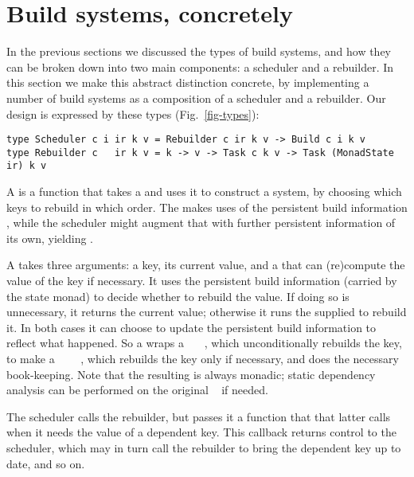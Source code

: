 \section{Build systems, concretely}\label{sec-implementations}

In the previous sections we discussed the types of build systems, and how they
can be broken down into two main components: a scheduler and a rebuilder.
In this section we make this abstract distinction concrete, by
implementing a number of build systems as a composition of a scheduler
and a rebuilder.  Our design is expressed by these types (Fig.~\ref{fig-types}):

\begin{verbatim}
type Scheduler c i ir k v = Rebuilder c ir k v -> Build c i k v
type Rebuilder c   ir k v = k -> v -> Task c k v -> Task (MonadState ir) k v
\end{verbatim}

\noindent
A  is a function that takes a  and uses
it to construct a  system, by choosing which keys to rebuild in which
order. The  makes uses of the persistent build information
, while the scheduler might augment that with further persistent
information of its own, yielding .

A  takes three arguments: a key, its current value, and a
 that can (re)compute the value of the key if necessary. It uses the
persistent build information  (carried by the state monad) to decide
whether to rebuild the value. If doing so is unnecessary, it returns the current
value; otherwise it runs the supplied  to rebuild it. In both cases it
can choose to update the persistent build information  to reflect what
happened. So a  wraps a ~~~, which
unconditionally rebuilds the key, to make a
~~~~, which rebuilds the key only
if necessary, and does the necessary book-keeping. Note that the resulting
 is always monadic; static dependency analysis can be performed on the
original ~ if needed.

The scheduler calls the rebuilder, but passes it a  function
that that latter calls when it needs the value of a dependent key.  This
callback returns control to the scheduler, which may in turn call the
rebuilder to bring the dependent key up to date, and so on.

